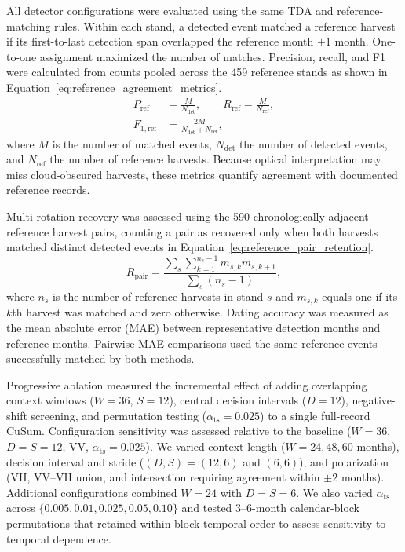 All detector configurations were evaluated using the same TDA and reference-matching rules. Within each stand, a detected event matched a reference harvest if its first-to-last detection span overlapped the reference month $\pm1$ month. One-to-one assignment maximized the number of matches. Precision, recall, and F1 were calculated from counts pooled across the 459 reference stands as shown in Equation~\eqref{eq:reference_agreement_metrics}.
\begin{equation}
    \begin{aligned}
        P_{\mathrm{ref}} &= \frac{M}{N_{\mathrm{det}}}, \qquad
        R_{\mathrm{ref}} = \frac{M}{N_{\mathrm{ref}}},\\
        F_{1,\mathrm{ref}} &= \frac{2M}{N_{\mathrm{det}}+N_{\mathrm{ref}}},
    \end{aligned}
    \label{eq:reference_agreement_metrics}
\end{equation}
where $M$ is the number of matched events, $N_{\mathrm{det}}$ the number of detected events, and $N_{\mathrm{ref}}$ the number of reference harvests. Because optical interpretation may miss cloud-obscured harvests, these metrics quantify agreement with documented reference records.

Multi-rotation recovery was assessed using the 590 chronologically adjacent reference harvest pairs, counting a pair as recovered only when both harvests matched distinct detected events in Equation~\eqref{eq:reference_pair_retention}.
\begin{equation}
    R_{\mathrm{pair}}
    =
    \frac{
        \sum_s\sum_{k=1}^{n_s-1} m_{s,k}m_{s,k+1}
    }{
        \sum_s(n_s-1)
    },
    \label{eq:reference_pair_retention}
\end{equation}
where $n_s$ is the number of reference harvests in stand $s$ and $m_{s,k}$ equals one if its $k$th harvest was matched and zero otherwise. Dating accuracy was measured as the mean absolute error (MAE) between representative detection months and reference months. Pairwise MAE comparisons used the same reference events successfully matched by both methods.

Progressive ablation measured the incremental effect of adding overlapping context windows ($W=36$, $S=12$), central decision intervals ($D=12$), negative-shift screening, and permutation testing ($\alpha_{\mathrm{ts}}=0.025$) to a single full-record CuSum. Configuration sensitivity was assessed relative to the baseline ($W=36$, $D=S=12$, VV, $\alpha_{\mathrm{ts}}=0.025$). We varied context length ($W=24,48,60$ months), decision interval and stride ($(D,S)=(12,6)$ and $(6,6)$), and polarization (VH, VV--VH union, and intersection requiring agreement within $\pm2$ months). Additional configurations combined $W=24$ with $D=S=6$. We also varied $\alpha_{\mathrm{ts}}$ across $\{0.005,0.01,0.025,0.05,0.10\}$ and tested 3--6-month calendar-block permutations that retained within-block temporal order to assess sensitivity to temporal dependence.

